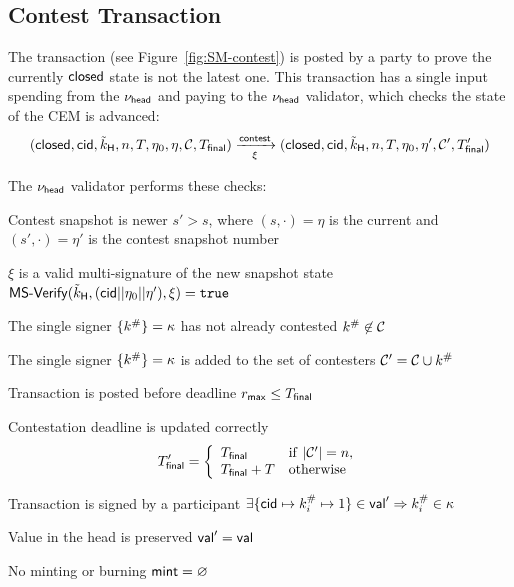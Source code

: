 \subsection{Contest Transaction}\label{sec:contest-tx}

The \mtxContest{} transaction (see Figure~\ref{fig:SM-contest}) is posted
by a party to prove the currently $\mathsf{closed}$ state is not the latest one. This
transaction has a single input spending from the $\nu_\mathsf{head}$ and paying to the
$\nu_\mathsf{head}$ validator, which checks the state of the CEM is advanced:
\[
  (\mathsf{closed},\mathsf{cid},\tilde{k}_{\mathsf{H}},n,T,\eta_0,\eta,\mathcal{C},T_{\mathsf{final}}) \xrightarrow[\xi]{\mathsf{contest}} (\mathsf{closed},\mathsf{cid},\tilde{k}_{\mathsf{H}},n,T,\eta_0,\eta',\mathcal{C}',T_{\mathsf{final}}')
\]

\begin{samepage}
\noindent The $\nu_\mathsf{head}$ validator performs these checks:
\begin{menumerate}
  \item Contest snapshot is newer $s' > s$, where $(s, \cdot) = \eta$ is the current and $(s', \cdot) = \eta'$ is the contest snapshot number
  \item $\xi$ is a valid multi-signature of the new snapshot state
  $\mathsf{MS\textsf{-}{}Verify}(\tilde{k}_{\mathsf{H}},(\mathsf{cid} || \eta_{0} || \eta'),\xi) = \mathtt{true}$
  \item The single signer $\{k^{\#}\} = \kappa$ has not already contested $k^{\#} \not\in \mathcal{C}$ 
  \item The single signer $\{k^{\#}\} = \kappa$ is added to the set of contesters $\mathcal{C}' = \mathcal{C} \cup k^{\#}$
  \item Transaction is posted before deadline $r_{\mathsf{max}} \leq T_{\mathsf{final}}$
  \item Contestation deadline is updated correctly
     \[
       T_{\mathsf{final}}' = \left\{\begin{array}{ll}
                           T_{\mathsf{final}}     & \mathrm{if} ~ |\mathcal{C}'| = n, \\
                           T_{\mathsf{final}} + T & \mathrm{otherwise}
                         \end{array}\right.
    \]
  \item Transaction is signed by a participant $\exists \{\mathsf{cid} \mapsto k^{\#}_{i} \mapsto 1\} \in \mathsf{val}' \Rightarrow k^{\#}_{i} \in \kappa$
  \item Value in the head is preserved $\mathsf{val}' = \mathsf{val}$
  \item No minting or burning $\mathsf{mint} = \varnothing$
\end{menumerate}
\end{samepage}


